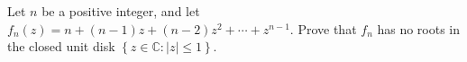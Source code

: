 Let $n$ be a positive integer, and let $f_n\left(z\right)=n+\left(n-1\right)z+\left(n-2\right)z^2+\cdots+z^{n-1}$. Prove that $f_n$ has no roots in the closed unit disk $\left\{z\in\mathbb{C}:\left|z\right|\leq1\right\}$.